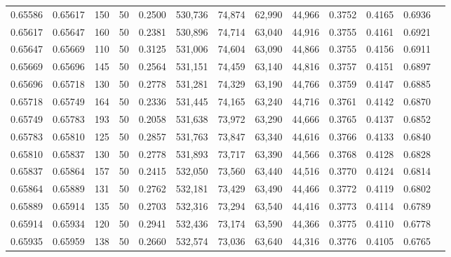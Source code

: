 \begin{tabular}{rrrrrrrrrrrrr}
0.65586 & 0.65617 &   150 &  50 &                                     0.2500 & 530,736 &  74,874 &  62,990 &  44,966 & 0.3752 & 0.4165 & 0.6936 \\
0.65617 & 0.65647 &   160 &  50 &                                     0.2381 & 530,896 &  74,714 &  63,040 &  44,916 & 0.3755 & 0.4161 & 0.6921 \\
0.65647 & 0.65669 &   110 &  50 &                                     0.3125 & 531,006 &  74,604 &  63,090 &  44,866 & 0.3755 & 0.4156 & 0.6911 \\
0.65669 & 0.65696 &   145 &  50 &                                     0.2564 & 531,151 &  74,459 &  63,140 &  44,816 & 0.3757 & 0.4151 & 0.6897 \\
0.65696 & 0.65718 &   130 &  50 &                                     0.2778 & 531,281 &  74,329 &  63,190 &  44,766 & 0.3759 & 0.4147 & 0.6885 \\
0.65718 & 0.65749 &   164 &  50 &                                     0.2336 & 531,445 &  74,165 &  63,240 &  44,716 & 0.3761 & 0.4142 & 0.6870 \\
0.65749 & 0.65783 &   193 &  50 &                                     0.2058 & 531,638 &  73,972 &  63,290 &  44,666 & 0.3765 & 0.4137 & 0.6852 \\
0.65783 & 0.65810 &   125 &  50 &                                     0.2857 & 531,763 &  73,847 &  63,340 &  44,616 & 0.3766 & 0.4133 & 0.6840 \\
0.65810 & 0.65837 &   130 &  50 &                                     0.2778 & 531,893 &  73,717 &  63,390 &  44,566 & 0.3768 & 0.4128 & 0.6828 \\
0.65837 & 0.65864 &   157 &  50 &                                     0.2415 & 532,050 &  73,560 &  63,440 &  44,516 & 0.3770 & 0.4124 & 0.6814 \\
0.65864 & 0.65889 &   131 &  50 &                                     0.2762 & 532,181 &  73,429 &  63,490 &  44,466 & 0.3772 & 0.4119 & 0.6802 \\
0.65889 & 0.65914 &   135 &  50 &                                     0.2703 & 532,316 &  73,294 &  63,540 &  44,416 & 0.3773 & 0.4114 & 0.6789 \\
0.65914 & 0.65934 &   120 &  50 &                                     0.2941 & 532,436 &  73,174 &  63,590 &  44,366 & 0.3775 & 0.4110 & 0.6778 \\
0.65935 & 0.65959 &   138 &  50 &                                     0.2660 & 532,574 &  73,036 &  63,640 &  44,316 & 0.3776 & 0.4105 & 0.6765 \\

\end{tabular}
